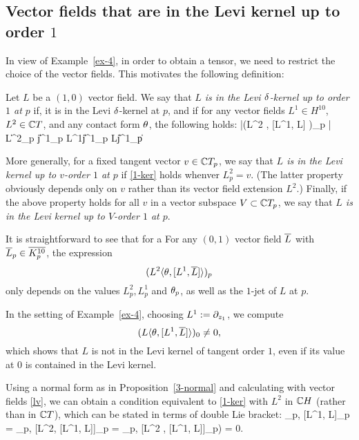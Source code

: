 \documentclass[12pt]{amsart}
\begin{document}
\subsection{Vector fields that are in the Levi kernel up to order $1$}
In view of Example~\ref{ex-4},
in order to obtain a tensor, we need to restrict
the choice of the vector fields.
This motivates the following definition:

\bd{}
Let $L$ be a $(1,0)$ vector field.
We say that 
{\em $L$ is in the Levi $\delta$-kernel up to
order $1$ at $p$} if,
it is in the Levi $\delta$-kernel at $p$, and if
for any vector fields $L^1\in H^{10}$, $L^2\in {\mathbb{C}} T$,
and any contact form $\theta$, the following holds:
\beq{}
	|(L^2 \la \th, [L^1, \1L] \ra)_p | \le 
	\de
	\| L^2_p \|
	\| j^1_p L^1\|
	\| j^1_p \1L\|
	\| j^1_p\th\| 
\eeq

More generally, 
for a fixed tangent vector $v\in {\mathbb{C}} T_p$,
we say that
{\em $L$ is in the Levi kernel up to 
$v$-order $1$ at $p$} 
if \eqref{1-ker}
holds whenver $L^2_p=v$. 
(The latter property obviously depends only on $v$
rather than its vector field extension $L^2$.)
Finally, if the above property holds for all $v$
in a vector subspace $V\subset {\mathbb{C}} T_p$,
we say that
{\em $L$ is in the Levi kernel up to 
$V$-order $1$ at $p$}.
\ed



It is straightforward to see that for a
\bl{}
For any $(0,1)$ vector field $\overline{L}$
with $\overline{L}_p\in \overline{K^{10}_p}$, 
the expression
$$ 
	(L^2 \langle \theta, [L^1, \overline{L}] \rangle)_p 
$$
only depends on the values $L^2_p, L^1_p$ and $\theta_p$,
as well as the $1$-jet of $L$ at $p$.
\el

\be
In the setting of Example~\ref{ex-4},
choosing $L^1:= \partial_{z_1}$, we compute
$$
	(L \langle \theta, [L^1, \overline{L}] \rangle )_0 \ne 0,
$$
which shows that $L$ is not in the Levi kernel of tangent order $1$,
even if its value at $0$ is contained in the Levi kernel.
\ee


\br{}
Using a normal form as in Proposition~\ref{3-normal} 
and calculating with vector fields \eqref{lv},
we can obtain a condition equivalent to
 \eqref{1-ker}
with $L^2$ in ${\mathbb{C}} H$ (rather than in ${\mathbb{C}} T$), which can be 
stated in terms of double Lie bracket:
\beq{}
	\la \th_p, [L^1, \1L]_p\ra
	= \la \th_p, [L^2, [L^1, \1L]]_p \ra 
	= \la \th_p, [\1L^2 , [L^1, \1L]]_p\ra)
	= 0.
\eeq
\er
\end{document}
